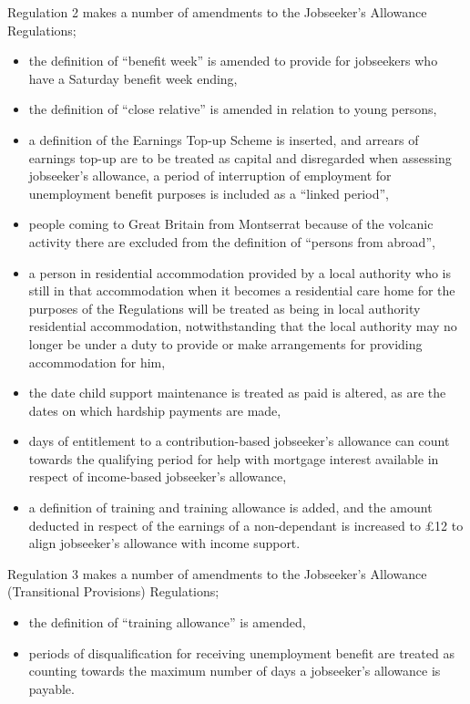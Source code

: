 \documentclass[12pt,a4paper]{article}
\begin{document}
  Regulation 2 makes a number of amendments to the Jobseeker’s Allowance Regulations;
\begin{itemize}
\item the definition of “benefit week” is amended to provide for jobseekers who have a Saturday benefit week ending,
\item the definition of “close relative” is amended in relation to young persons,
\item a definition of the Earnings Top-up Scheme is inserted, and arrears of earnings top-up are to be treated as capital and disregarded when assessing jobseeker’s allowance,
a period of interruption of employment for unemployment benefit purposes is included as a “linked period”,
\item people coming to Great Britain from Montserrat because of the volcanic activity there are excluded from the definition of “persons from abroad”,
\item a person in residential accommodation provided by a local authority who is still in that accommodation when it becomes a residential care home for the purposes of the Regulations will be treated as being in local authority residential accommodation, notwithstanding that the local authority may no longer be under a duty to provide or make arrangements for providing accommodation for him,
\item the date child support maintenance is treated as paid is altered, as are the dates on which hardship payments are made,
\item days of entitlement to a contribution-based jobseeker’s allowance can count towards the qualifying period for help with mortgage interest available in respect of income-based jobseeker’s allowance,
\item a definition of training and training allowance is added, and the amount deducted in respect of the earnings of a non-dependant is increased to £12 to align jobseeker’s allowance with income support.
\end{itemize}

  Regulation 3 makes a number of amendments to the Jobseeker’s Allowance (Transitional Provisions) Regulations;
\begin{itemize}
\item the definition of “training allowance” is amended,
\item periods of disqualification for receiving unemployment benefit are treated as counting towards the maximum number of days a jobseeker’s allowance is payable.
\end{itemize}
\end{document}
